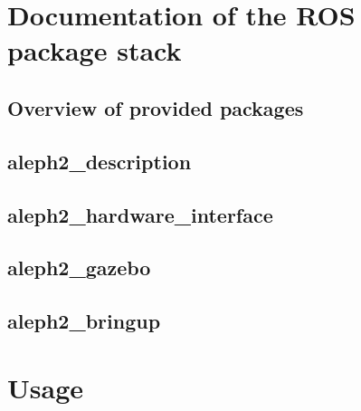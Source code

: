 \documentclass[english,inz,shortabstract]{iithesis}
\begin{document}
\chapter{Documentation of the ROS package stack}

\section{Overview of provided packages}

\section{aleph2\_description}

\section{aleph2\_hardware\_interface}

\section{aleph2\_gazebo}

\section{aleph2\_bringup}

\chapter{Usage}



\end{document}
